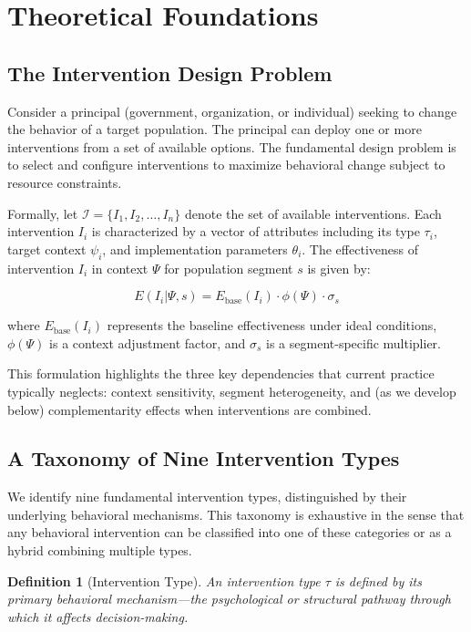 \documentclass[12pt,a4paper]{article}
\newtheorem{definition}{Definition}
\begin{document}
\section{Theoretical Foundations}

\subsection{The Intervention Design Problem}

Consider a principal (government, organization, or individual) seeking to change the behavior of a target population. The principal can deploy one or more interventions from a set of available options. The fundamental design problem is to select and configure interventions to maximize behavioral change subject to resource constraints.

Formally, let $\mathcal{I} = \{I_1, I_2, \ldots, I_n\}$ denote the set of available interventions. Each intervention $I_i$ is characterized by a vector of attributes including its type $\tau_i$, target context $\psi_i$, and implementation parameters $\theta_i$. The effectiveness of intervention $I_i$ in context $\Psi$ for population segment $s$ is given by:

\begin{equation}
E(I_i | \Psi, s) = E_{\text{base}}(I_i) \cdot \phi(\Psi) \cdot \sigma_s
\label{eq:effectiveness}
\end{equation}

\noindent where $E_{\text{base}}(I_i)$ represents the baseline effectiveness under ideal conditions, $\phi(\Psi)$ is a context adjustment factor, and $\sigma_s$ is a segment-specific multiplier.

This formulation highlights the three key dependencies that current practice typically neglects: context sensitivity, segment heterogeneity, and (as we develop below) complementarity effects when interventions are combined.

\subsection{A Taxonomy of Nine Intervention Types}

We identify nine fundamental intervention types, distinguished by their underlying behavioral mechanisms. This taxonomy is exhaustive in the sense that any behavioral intervention can be classified into one of these categories or as a hybrid combining multiple types.

\begin{definition}[Intervention Type]
An intervention type $\tau$ is defined by its primary behavioral mechanism---the psychological or structural pathway through which it affects decision-making.
\end{definition}
\end{document}
